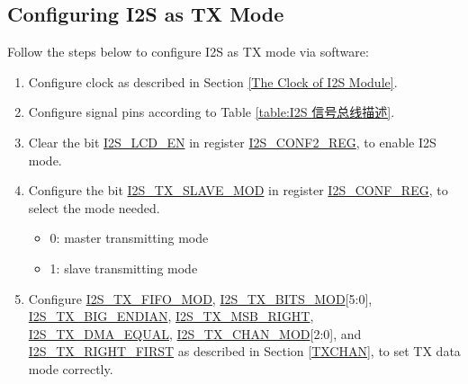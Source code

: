 \documentclass[main\_\_EN.tex]{subfiles}
\begin{document}
\subsection{Configuring I2S as TX Mode}\label{sec:i2s-conf-tx-mode}

Follow the steps below to configure I2S as TX mode via software:

\begin{enumerate}
    \item Configure clock as described in Section \ref{The Clock of I2S Module}.

    \item Configure signal pins according to Table \ref{table:I2S 信号总线描述}.

    \item Clear the bit \hyperref[fielddesc:I2SLCDEN]{I2S\_LCD\_EN} in register \hyperref[regdesc:I2SCONF2REG]{I2S\_CONF2\_REG}, to enable I2S mode.

    \item Configure the bit \hyperref[fielddesc:I2STXSLAVEMOD]{I2S\_TX\_SLAVE\_MOD} in register \hyperref[regdesc:I2SCONFREG]{I2S\_CONF\_REG}, to select the mode needed.

    \begin{itemize}
        \item 0: master transmitting mode
        \item 1: slave transmitting mode
    \end{itemize}

    \item Configure \hyperref[fielddesc:I2STXFIFOMOD]{I2S\_TX\_FIFO\_MOD}, \hyperref[fielddesc:I2STXBITSMOD]{I2S\_TX\_BITS\_MOD}[5:0], \hyperref[fielddesc:I2STXBIGENDIAN]{I2S\_TX\_BIG\_ENDIAN}, \hyperref[fielddesc:I2STXMSBRIGHT]{I2S\_TX\_MSB\_RIGHT}, \\\hyperref[fielddesc:I2STXDMAEQUAL]{I2S\_TX\_DMA\_EQUAL}, \hyperref[fielddesc:I2STXCHANMOD]{I2S\_TX\_CHAN\_MOD}[2:0], and \hyperref[fielddesc:I2STXRIGHTFIRST]{I2S\_TX\_RIGHT\_FIRST} as described in Section \ref{TXCHAN}, to set TX data mode correctly.


\end{enumerate}
\end{document}
